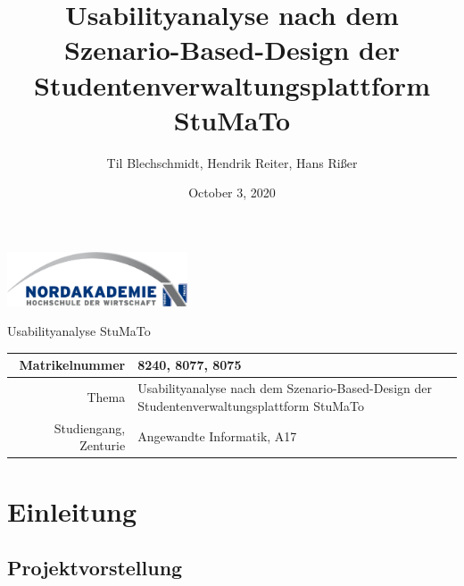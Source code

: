 \documentclass[
  12pt,
  ngerman,
  a4paper,
]{article}
\title{Usabilityanalyse nach dem Szenario-Based-Design der
Studentenverwaltungsplattform StuMaTo}
\author{Til Blechschmidt, Hendrik Reiter, Hans Rißer}
\date{October 3, 2020}
\begin{document}
\begin{center}
  \includegraphics[width=0.4\textwidth,keepaspectratio]{.template/logo}
  \vspace{2cm}
\end{center}

\begin{center}
  {\huge Usabilityanalyse StuMaTo}
  \vspace{1cm}
\end{center}

\begin{center}
  \begin{tabularx}{\textwidth}{r|X}
    Matrikelnummer & 8240, 8077, 8075 \\\midrule
    Thema & Usabilityanalyse nach dem Szenario-Based-Design der
Studentenverwaltungsplattform StuMaTo \\\midrule
    Studiengang, Zenturie & Angewandte Informatik, A17\
  \end{tabularx}
\end{center}


\pagebreak

\pagestyle{fancy}
\cfoot{\thepage}

\linespread{1.5}
\setcounter{tocdepth}{2}
\setcounter{secnumdepth}{3}


{
\setcounter{tocdepth}{3}
\tableofcontents
}
\pagebreak
{}
\listoftables
{}
\listoffigures
\pagebreak
{}
\renewcommand{\arraystretch}{1.5}

\hypertarget{einleitung}{%
\section{Einleitung}\label{einleitung}}

\hypertarget{projektvorstellung}{%
\subsection{Projektvorstellung}\label{projektvorstellung}}
\end{document}
